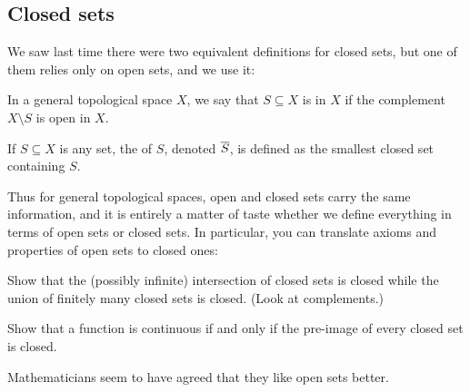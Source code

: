 
\subsection{Closed sets}
We saw last time there were two equivalent definitions
for closed sets, but one of them relies only on open sets, and we use it:
\begin{definition}
	\label{def:closure}
	In a general topological space $X$, we say that $S \subseteq X$ is
	 in $X$ if the complement $X \setminus S$ is open in $X$.

	If $S \subseteq X$ is any set, the  of $S$,
	denoted $\overline S$,
	is defined as the smallest closed set containing $S$.
\end{definition}
Thus for general topological spaces,
open and closed sets carry the same information,
and it is entirely a matter of taste whether we define everything in terms
of open sets or closed sets.
In particular, you can translate axioms and properties of open sets to closed ones:
\begin{ques}
	Show that the (possibly infinite) intersection of closed sets is closed
	while the union of finitely many closed sets is closed.
	(Look at complements.)
\end{ques}
\begin{exercise}
	Show that a function is continuous if and only if the pre-image
	of every closed set is closed.
\end{exercise}
Mathematicians seem to have agreed that they like open sets better.


